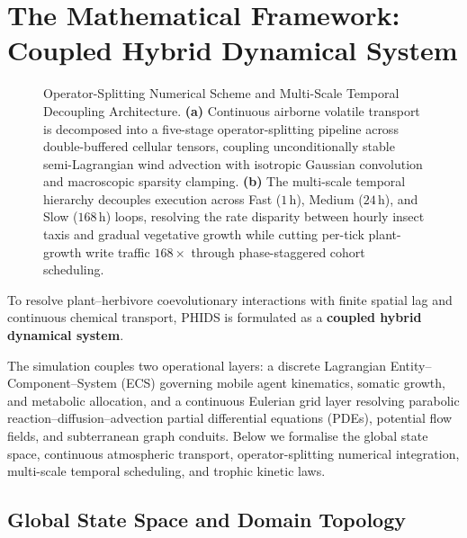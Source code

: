 
\section{The Mathematical Framework: Coupled Hybrid Dynamical System}
\label{sec:mathematical_framework}

\begin{figure}[t]
  
  \caption{Operator-Splitting Numerical Scheme and Multi-Scale Temporal Decoupling Architecture. \textbf{(a)} Continuous airborne volatile transport is decomposed into a five-stage operator-splitting pipeline across double-buffered cellular tensors, coupling unconditionally stable semi-Lagrangian wind advection with isotropic Gaussian convolution and macroscopic sparsity clamping. \textbf{(b)} The multi-scale temporal hierarchy decouples execution across Fast ($1\,\text{h}$), Medium ($24\,\text{h}$), and Slow ($168\,\text{h}$) loops, resolving the rate disparity between hourly insect taxis and gradual vegetative growth while cutting per-tick plant-growth write traffic $168\times$ through phase-staggered cohort scheduling.}
  \label{fig:operator_splitting_pipeline}
\end{figure}

To resolve plant--herbivore coevolutionary interactions with finite spatial lag and continuous chemical transport, PHIDS is formulated as a \textbf{coupled hybrid dynamical system}.

The simulation couples two operational layers: a discrete Lagrangian Entity--Component--System (ECS) governing mobile agent kinematics, somatic growth, and metabolic allocation, and a continuous Eulerian grid layer resolving parabolic reaction--diffusion--advection partial differential equations (PDEs), potential flow fields, and subterranean graph conduits. Below we formalise the global state space, continuous atmospheric transport, operator-splitting numerical integration, multi-scale temporal scheduling, and trophic kinetic laws.

\subsection{Global State Space and Domain Topology}
\label{subsec:state_space_topology}

